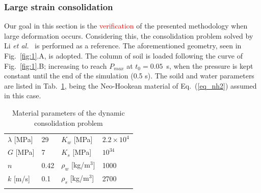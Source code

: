 \documentclass[twocolumn]{svjour3}          %
\begin{document}
\subsubsection{Large strain consolidation}
\label{sec:5:1:1}

Our goal in this section is the \textcolor{red}{verification} of the presented methodology when large deformation occurs. Considering this, the consolidation problem solved by Li \textit{et al.}~\cite{LiBorja2004}  is performed as a reference. The aforementioned geometry, seen in Fig.~\ref{fig:1}.A, is adopted. The column of soil is loaded following the curve of Fig.~\ref{fig:1}.B; increasing to reach $P_{max}$ at $t_0=0.05$~s, when the pressure is kept constant until the end of the simulation (0.5 s). The soild and water parameters are listed in Tab.~\ref{tab:4}, being the Neo-Hookean material of Eq.~(\ref{eq_nh2}) assumed in this case. 
\begin{table}
\centering
\caption{ Material parameters of the dynamic consolidation problem} \label{tab:4}
	\vspace*{0.2cm}
	\begin{tabular}{ll | ll}
	\hline\noalign{\smallskip}
	$\lambda$ [MPa] & 29 & $K_w$ [MPa] & $2.2 \times 10^4$ \\
		\noalign{\smallskip}\hline\noalign{\smallskip}
	$G$ [MPa] & 7 & $K_s$ [MPa] & $10^{34}$ \\
			\noalign{\smallskip}\hline\noalign{\smallskip}
	$n$ & 0.42 & $\rho_w$ [kg/$\textrm{m}^3$] & 1000 \\
				\noalign{\smallskip}\hline\noalign{\smallskip}
	$k$ [m/s] & 0.1 & $\rho_s$ [kg/$\textrm{m}^3$] & 2700 \\
\hline\noalign{\smallskip}
	\end{tabular}
\end{table}
\end{document}
